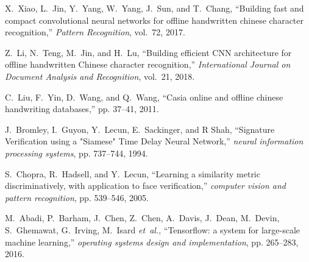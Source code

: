 \documentclass[conference]{IEEEtran}
\begin{document}
\begin{thebibliography}{1}
X.~Xiao, L.~Jin, Y.~Yang, W.~Yang, J.~Sun, and T.~Chang, ``Building fast and
compact convolutional neural networks for offline handwritten chinese
character recognition,'' \emph{Pattern Recognition}, vol.~72, 2017.

Z.~Li, N.~Teng, M.~Jin, and H.~Lu, ``Building efficient CNN architecture for offline handwritten Chinese character recognition,'' \emph{International Journal on Document Analysis and Recognition}, vol.~21, 2018.

C.~Liu, F.~Yin, D.~Wang, and Q.~Wang, ``Casia online and offline chinese
handwriting databases,'' pp. 37--41, 2011.

J.~Bromley, I.~Guyon, Y.~Lecun, E.~Sackinger, and R Shah, ``Signature Verification using a "Siamese" Time Delay Neural Network,'' \emph{neural information processing systems}, pp. 737--744, 1994.

S.~Chopra, R.~Hadsell, and Y.~Lecun, ``Learning a similarity metric discriminatively, with application to face verification,'' \emph{computer vision and pattern recognition}, pp. 539--546, 2005.

M.~Abadi, P.~Barham, J.~Chen, Z.~Chen, A.~Davis, J.~Dean, M.~Devin,
S.~Ghemawat, G.~Irving, M.~Isard \emph{et~al.}, ``Tensorflow: a system for
large-scale machine learning,'' \emph{operating systems design and
	implementation}, pp. 265--283, 2016.

\end{thebibliography}




\end{document}
